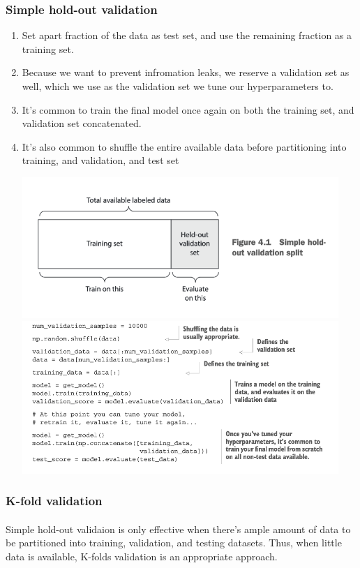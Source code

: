 \documentclass[12pt, a4paper]{article}
\begin{document}
\subsubsection{Simple hold-out validation}
\begin{enumerate}
   \item Set apart fraction of the data as test set, and use the remaining fraction
   as a training set.
   \item Because we want to prevent infromation leaks, we reserve a validation set as well,
   which we use as the validation set we tune our hyperparameters to.
   \item It's common to train the final model once again on both the training set,
   and validation set concatenated.
   \item It's also common to shuffle the entire available data before partitioning into training, and validation, and test set
   
   {
      \centering
      \includegraphics[width=12cm]{hold_out_validation.png}
      \includegraphics[width=12cm]{hold_out_validation_snippet.png}

   }
\end{enumerate}

\newpage
\subsubsection{K-fold validation}
\paragraph*{}
Simple hold-out validaion is only effective when there's ample amount of data to be 
partitioned into training, validation, and testing datasets. Thus, when little data 
is available, K-folds validation is an appropriate approach.
\end{document}
